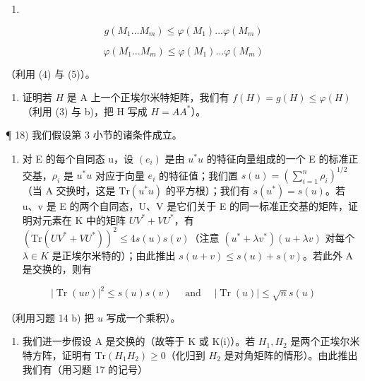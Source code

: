 \begin{enumerate}
\def\labelenumi{(\arabic{enumi})}
\setcounter{enumi}{5}
\tightlist
\item
\end{enumerate}

\[
g (M _ {1} \dots M _ {m}) \leqslant \varphi (M _ {1}) \dots \varphi (M _ {m})\tag{7}
\]

\[
\varphi (M _ {1} \dots M _ {m}) \leqslant \varphi (M _ {1}) \dots \varphi (M _ {m})
\]

（利用 (4) 与 (5)）。

\begin{enumerate}
\def\labelenumi{\alph{enumi})}
\setcounter{enumi}{2}
\tightlist
\item
  证明若 \(H\) 是 A 上一个正埃尔米特矩阵，我们有 \(f(H) = g(H) \leqslant \varphi(H)\)（利用 (3) 与 b)，把 H 写成 \(H = AA^{*}\)）。
\end{enumerate}

¶ 18) 我们假设第 3 小节的诸条件成立。

\begin{enumerate}
\def\labelenumi{\alph{enumi})}
\tightlist
\item
  对 E 的每个自同态 u，设 \((e_{i})\) 是由 \(u^{*}u\) 的特征向量组成的一个 E 的标准正交基，\(\rho_{i}\) 是 \(u^{*}u\) 对应于向量 \(e_{i}\) 的特征值；我们置 \(s(u) = (\sum_{i=1}^{n} \rho_{i})^{1/2}\)（当 A 交换时，这是 \(\mathrm{Tr}(u^{*}u)\) 的平方根）；我们有 \(s(u^{*}) = s(u)\)。若 u、v 是 E 的两个自同态，U、V 是它们关于 E 的同一标准正交基的矩阵，证明对元素在 K 中的矩阵 \(UV^{*} + VU^{*}\)，有 \((\mathrm{Tr}(UV^{*} + VU^{*}))^{2} \leqslant 4s(u)s(v)\)（注意 \((u^{*} + \lambda v^{*})(u + \lambda v)\) 对每个 \(\lambda \in K\) 是正埃尔米特的）；由此推出 \(s(u + v) \leqslant s(u) + s(v)\)。若此外 A 是交换的，则有
\end{enumerate}

\[
\left| \operatorname{Tr} (u v) \right| ^ {2} \leqslant s (u) s (v) \quad \text { and } \quad \left| \operatorname{Tr} (u) \right| \leqslant \sqrt {n} s (u)
\]

（利用习题 14 b) 把 \(u\) 写成一个乘积）。

\begin{enumerate}
\def\labelenumi{\alph{enumi})}
\setcounter{enumi}{1}
\tightlist
\item
  我们进一步假设 A 是交换的（故等于 K 或 K(i)）。若 \(H_{1}, H_{2}\) 是两个正埃尔米特方阵，证明有 \(\mathrm{Tr}(H_{1}H_{2}) \geqslant 0\)（化归到 \(H_{2}\) 是对角矩阵的情形）。由此推出我们有（用习题 17 的记号）
\end{enumerate}

